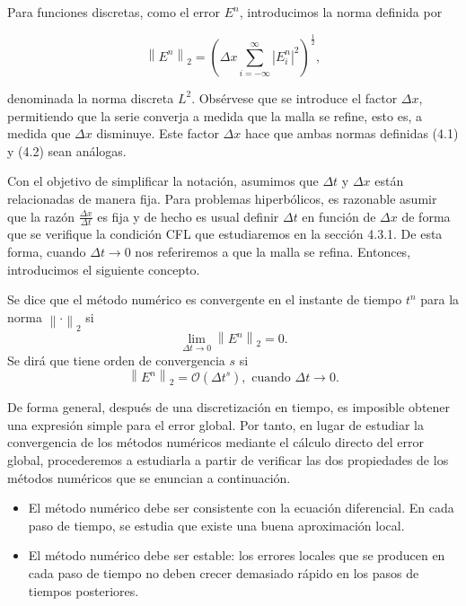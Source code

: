 Para funciones discretas, como el error $E^{n}$, introducimos la
norma definida por

\begin{equation*}
  {\left\|E^{n}\right\|}_{2}=
    {
      \left(
      \Delta x
      \sum_{i=-\infty}^{\infty}
      {\left|E^{n}_{i}\right|}^{2}
      \right)
    }^{\frac{1}{2}},
\end{equation*}

denominada la norma discreta $L^{2}$.
Obsérvese que se introduce el factor $\Delta x$, permitiendo que la
serie converja a medida que la malla se refine, esto es, a medida que
$\Delta x$ disminuye.
Este factor $\Delta x$ hace que ambas normas definidas (4.1) y (4.2)
sean análogas.

Con el objetivo de simplificar la notación, asumimos que $\Delta t$ y
$\Delta x$ están relacionadas de manera fija.
Para problemas hiperbólicos, es razonable asumir que la razón
\begin{math}
  \frac{\Delta x}{\Delta t}
\end{math}
es fija y de hecho es usual definir $\Delta t$ en función de $\Delta x$
de forma que se verifique la condición CFL que estudiaremos en la sección 4.3.1.
De esta forma, cuando $\Delta t\to 0$ nos referiremos a que la malla se refina.
Entonces, introducimos el siguiente concepto.

\begin{definition}
  Se dice que el método numérico es convergente en el instante de
  tiempo $t^{n}$ para la norma ${\left\|\cdot\right\|}_{2}$ si
  \begin{equation*}
    \lim_{\Delta t\to0}
    {\left\|E^{n}\right\|}_{2}=
    0.
  \end{equation*}
  Se dirá que tiene orden de convergencia $s$ si
  \begin{equation*}
    \left\|
    E^{n}
    \right\|_{2}=
    \mathcal{O}
    \left({\Delta t}^{s}\right),
    \text{ cuando }
    \Delta t\to 0.
  \end{equation*}
\end{definition}

De forma general, después de una discretización en tiempo, es
imposible obtener una expresión simple para el error global.
Por tanto, en lugar de estudiar la convergencia de los métodos
numéricos mediante el cálculo directo del error global, procederemos
a estudiarla a partir de verificar las dos propiedades de los métodos
numéricos que se enuncian a continuación.

\begin{itemize}
  \item

        El método numérico debe ser consistente con la ecuación
        diferencial.
        En cada paso de tiempo, se estudia que existe una buena
        aproximación local.

  \item

        El método numérico debe ser estable: los errores locales
        que se producen en cada paso de tiempo no deben crecer
        demasiado rápido en los pasos de tiempos posteriores.
\end{itemize}


